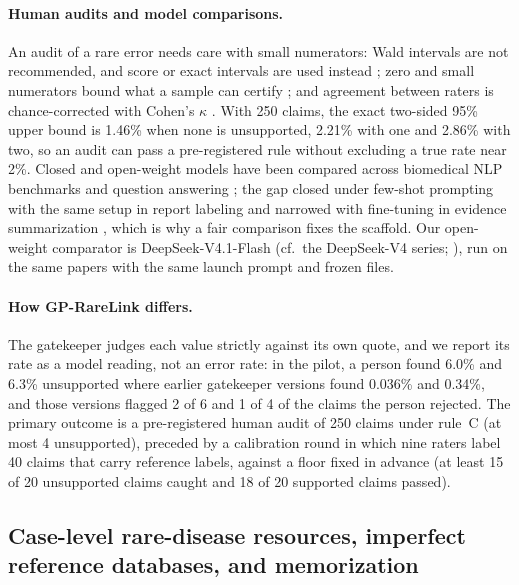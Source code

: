 \documentclass{article} %
\begin{document}
\paragraph{Human audits and model comparisons.} An audit of a rare error needs care with small numerators: Wald intervals are not recommended, and score or exact intervals are used instead \citep{brown2001_binomial_ci,Wilson1927ProbableInference,Clopper1934UseConfidence}; zero and small numerators bound what a sample can certify \citep{hanley1983_zero_numerators,newman1995_small_numerators}; and agreement between raters is chance-corrected with Cohen's $\kappa$ \citep{Cohen1960CoefficientAgreement}. With 250 claims, the exact two-sided 95\% upper bound is 1.46\% when none is unsupported, 2.21\% with one and 2.86\% with two, so an audit can pass a pre-registered rule without excluding a true rate near 2\%. Closed and open-weight models have been compared across biomedical NLP benchmarks and question answering \citep{chen2025_bionlp_benchmark,stachura2025_open_weight_bioasq}; the gap closed under few-shot prompting with the same setup in report labeling \citep{dorfner2024_open_vs_commercial_radiology} and narrowed with fine-tuning in evidence summarization \citep{zhang2024_open_vs_commercial_summarization}, which is why a fair comparison fixes the scaffold. Our open-weight comparator is DeepSeek-V4.1-Flash (cf.\ the DeepSeek-V4 series; \citealp{Deepseekai2026Deepseekv4Towards}), run on the same papers with the same launch prompt and frozen files.

\paragraph{How GP-RareLink differs.} The gatekeeper judges each value strictly against its own quote, and we report its rate as a model reading, not an error rate: in the pilot, a person found 6.0\% and 6.3\% unsupported where earlier gatekeeper versions found 0.036\% and 0.34\%, and those versions flagged 2 of 6 and 1 of 4 of the claims the person rejected. The primary outcome is a pre-registered human audit of 250 claims under rule~C (at most 4 unsupported), preceded by a calibration round in which nine raters label 40 claims that carry reference labels, against a floor fixed in advance (at least 15 of 20 unsupported claims caught and 18 of 20 supported claims passed).

\subsection{Case-level rare-disease resources, imperfect reference databases, and memorization}
\end{document}
